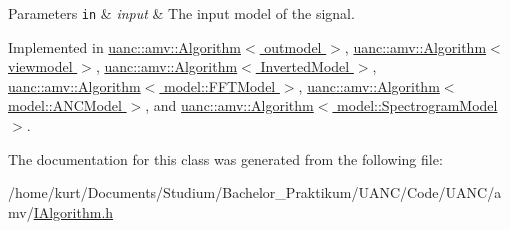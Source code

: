 \begin{DoxyParams}[1]{Parameters}
\mbox{\tt in}  & {\em input} & The input model of the signal. \\
\hline
\end{DoxyParams}


Implemented in \hyperlink{classuanc_1_1amv_1_1_algorithm_a0af524c2f170204c5c60b2561f286570}{uanc\+::amv\+::\+Algorithm$<$ outmodel $>$}, \hyperlink{classuanc_1_1amv_1_1_algorithm_a0af524c2f170204c5c60b2561f286570}{uanc\+::amv\+::\+Algorithm$<$ viewmodel $>$}, \hyperlink{classuanc_1_1amv_1_1_algorithm_a0af524c2f170204c5c60b2561f286570}{uanc\+::amv\+::\+Algorithm$<$ Inverted\+Model $>$}, \hyperlink{classuanc_1_1amv_1_1_algorithm_a0af524c2f170204c5c60b2561f286570}{uanc\+::amv\+::\+Algorithm$<$ model\+::\+F\+F\+T\+Model $>$}, \hyperlink{classuanc_1_1amv_1_1_algorithm_a0af524c2f170204c5c60b2561f286570}{uanc\+::amv\+::\+Algorithm$<$ model\+::\+A\+N\+C\+Model $>$}, and \hyperlink{classuanc_1_1amv_1_1_algorithm_a0af524c2f170204c5c60b2561f286570}{uanc\+::amv\+::\+Algorithm$<$ model\+::\+Spectrogram\+Model $>$}.



The documentation for this class was generated from the following file\+:\begin{DoxyCompactItemize}
\item 
/home/kurt/\+Documents/\+Studium/\+Bachelor\+\_\+\+Praktikum/\+U\+A\+N\+C/\+Code/\+U\+A\+N\+C/amv/\hyperlink{_i_algorithm_8h}{I\+Algorithm.\+h}\end{DoxyCompactItemize}
